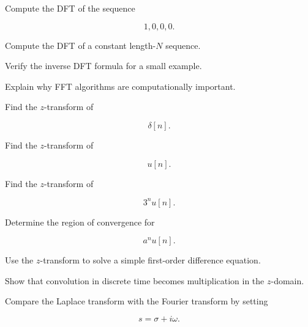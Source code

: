 \begin{exercise}[3]
Compute the DFT of the sequence

\[
1,0,0,0.
\]
\end{exercise}

\begin{exercise}[3]
Compute the DFT of a constant length-\(N\) sequence.
\end{exercise}

\begin{exercise}[3]
Verify the inverse DFT formula for a small example.
\end{exercise}

\begin{exercise}[3]
Explain why FFT algorithms are computationally important.
\end{exercise}

\begin{exercise}[2]
Find the \(z\)-transform of

\[
\delta[n].
\]
\end{exercise}

\begin{exercise}[2]
Find the \(z\)-transform of

\[
u[n].
\]
\end{exercise}

\begin{exercise}[2]
Find the \(z\)-transform of

\[
3^n u[n].
\]
\end{exercise}

\begin{exercise}[3]
Determine the region of convergence for

\[
a^n u[n].
\]
\end{exercise}

\begin{exercise}[3]
Use the \(z\)-transform to solve a simple first-order difference equation.
\end{exercise}

\begin{exercise}[3]
Show that convolution in discrete time becomes multiplication in the
\(z\)-domain.
\end{exercise}

\begin{exercise}[3]
Compare the Laplace transform with the Fourier transform by setting

\[
s=\sigma+i\omega.
\]
\end{exercise}

